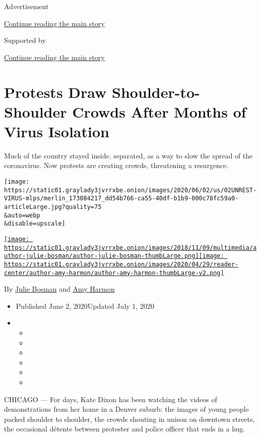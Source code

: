 Advertisement

\protect\hyperlink{after-top}{Continue reading the main story}

Supported by

\protect\hyperlink{after-sponsor}{Continue reading the main story}

\hypertarget{protests-draw-shoulder-to-shoulder-crowds-after-months-of-virus-isolation}{%
\section{Protests Draw Shoulder-to-Shoulder Crowds After Months of Virus
Isolation}\label{protests-draw-shoulder-to-shoulder-crowds-after-months-of-virus-isolation}}

Much of the country stayed inside, separated, as a way to slow the
spread of the coronavirus. Now protests are creating crowds, threatening
a resurgence.

\texttt{[image: https://static01.graylady3jvrrxbe.onion/images/2020/06/02/us/02UNREST-VIRUS-mlps/merlin\_173084217\_dd54b766-ca55-40df-b1b9-000c78fc59a0-articleLarge.jpg?quality=75\\\&auto=webp\\\&disable=upscale]}

\href{https://www.nytimes3xbfgragh.onion/by/julie-bosman}{\texttt{[image: https://static01.graylady3jvrrxbe.onion/images/2018/11/09/multimedia/author-julie-bosman/author-julie-bosman-thumbLarge.png]}}\href{https://www.nytimes3xbfgragh.onion/by/amy-harmon}{\texttt{[image: https://static01.graylady3jvrrxbe.onion/images/2020/04/29/reader-center/author-amy-harmon/author-amy-harmon-thumbLarge-v2.png]}}

By \href{https://www.nytimes3xbfgragh.onion/by/julie-bosman}{Julie
Bosman} and \href{https://www.nytimes3xbfgragh.onion/by/amy-harmon}{Amy
Harmon}

\begin{itemize}
\item
  Published June 2, 2020Updated July 1, 2020
\item
  \begin{itemize}
  \item
  \item
  \item
  \item
  \item
  \item
  \end{itemize}
\end{itemize}

CHICAGO --- For days, Kate Dixon has been watching the videos of
demonstrations from her home in a Denver suburb: the images of young
people packed shoulder to shoulder, the crowds shouting in unison on
downtown streets, the occasional détente between protester and police
officer that ends in a hug.

